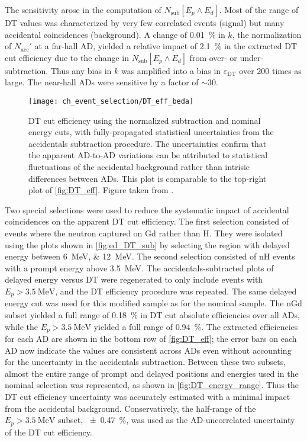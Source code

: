 The sensitivity arose in the computation of $N_\text{sub}[E_p \wedge E_d]$.
Most of the range of DT values was characterized by
very few correlated events (signal) but many accidental coincidences (background).
A change of \SI{0.01}{\percent} in $k$, the normalization
of $N_\text{acc}'$ at a far-hall AD,
yielded a relative impact of \SI{2.1}{\percent} in the extracted DT cut efficiency
due to the change in $N_\text{sub}[E_p \wedge E_d]$
from over- or under-subtraction.
Thus any bias in $k$ was amplified into a bias in $\varepsilon_\text{DT}$
over 200 times as large.
The near-hall ADs were sensitive by a factor of ${\sim}30$.

\begin{figure}
    \centering
    \texttt{[image: ch\_event\_selection/DT\_eff\_beda]}
    \caption[DT efficiency with full statistical uncertainty]{
        DT cut efficiency using the normalized subtraction
        and nominal energy cuts,
        with fully-propagated statistical uncertainties
        from the accidentals subtraction procedure.
        The uncertainties confirm that the apparent AD-to-AD variations
        can be attributed to statistical fluctuations of the accidental background
        rather than intrisic differences between ADs.
        This plot is comparable to the top-right plot of \cref{fig:DT_eff}.
        Figure taken from \cite{beda_DT_eff_unc}.
    }
    \label{fig:DT_eff_beda}
\end{figure}

Two special selections were used to reduce the systematic impact of accidental coincidences
on the apparent DT cut efficiency.
The first selection consisted of events where the neutron captured on Gd
rather than H.
They were isolated using the plots shown in \cref{fig:ed_DT_sub}
by selecting the region with delayed energy between \SIlist{6;12}{\MeV}.
The second selection consisted of nH events
with a prompt energy above \SI{3.5}{\MeV}.
The accidentals-subtracted plots of delayed energy versus DT were
regenerated to only include events with $E_p > \SI{3.5}{\MeV}$,
and the DT efficiency procedure was repeated.
The same delayed energy cut was used for this modified sample
as for the nominal sample.
The nGd subset yielded a full range of \SI{0.18}{\percent}
in DT cut absolute efficiencies over all ADs,
while the $E_p > \SI{3.5}{\MeV}$ yielded a full range of \SI{0.94}{\percent}.
The extracted efficiencies for each AD are shown in
the bottom row of \cref{fig:DT_eff};
the error bars on each AD now indicate the values are consistent across ADs
even without accounting for the uncertainty in the accidentals subtraction.
Between these two subsets, almost the entire range
of prompt and delayed positions and energies used in the nominal selection was represented,
as shown in \cref{fig:DT_energy_range}.
Thus the DT cut efficiency uncertainty was accurately estimated
with a minimal impact from the accidental background.
Conservatively, the half-range of the $E_p > \SI{3.5}{\MeV}$ subset,
\SI{\pm0.47}{\percent}, was
used as the AD-uncorrelated uncertainty of the DT cut efficiency.

